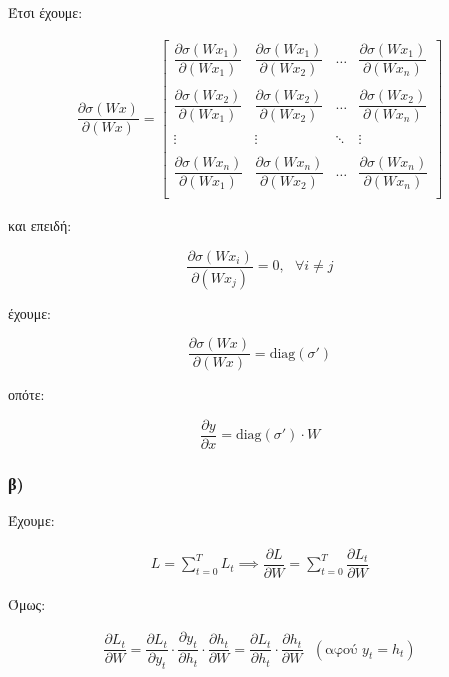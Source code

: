 \documentclass[12pt,a4paper]{article}
\begin{document}
				Έτσι έχουμε:
				
				
				
				\begin{align*}
					\dfrac{\partial \sigma(Wx)}{\partial (Wx)} =
						\begin{bmatrix}
							 \dfrac{\partial \sigma(Wx_1)}{\partial (Wx_1)} & \dfrac{\partial \sigma(Wx_1)}{\partial (Wx_2)} & \ldots & \dfrac{\partial \sigma(Wx_1)}{\partial (Wx_n)} \\
							 & & & \\
							 \dfrac{\partial \sigma(Wx_2)}{\partial (Wx_1)} & \dfrac{\partial \sigma(Wx_2)}{\partial (Wx_2)} & \ldots & \dfrac{\partial \sigma(Wx_2)}{\partial (Wx_n)} \\
							 & & & \\
							 \vdots & \vdots & \ddots & \vdots \\
							 & & & \\
							 \dfrac{\partial \sigma(Wx_n)}{\partial (Wx_1)} & \dfrac{\partial \sigma(Wx_n)}{\partial (Wx_2)} & \ldots & \dfrac{\partial \sigma(Wx_n)}{\partial (Wx_n)} \\
						\end{bmatrix}
				\end{align*}
				
				και επειδή:
				
				\[
					\dfrac{\partial \sigma (Wx_i)}{\partial(Wx_j)} = 0, ~~~\forall i \neq j
				\]
				
				έχουμε:
				
				\[
					\dfrac{\partial \sigma (Wx)}{\partial(Wx)} = \text{diag}(\sigma')
				\]
				
				οπότε:
				
				\[
					\dfrac{\partial y}{\partial x} = \text{diag}(\sigma') \cdot W
				\]
		
			\subsubsection*{β)}
				Έχουμε:
				
				\begin{align*}
					L = \sum_{t=0}^{T} L_t \implies \dfrac{\partial L}{\partial W} = \sum_{t = 0}^{T} \dfrac{\partial L_t}{\partial W}
				\end{align*}
				
				Όμως:
				
				\begin{align*}
					\dfrac{\partial L_t}{\partial W} = \dfrac{\partial L_t}{\partial y_t} \cdot \dfrac{\partial y_t}{\partial h_t} \cdot \dfrac{\partial h_t}{\partial W} =
					\dfrac{\partial L_t}{\partial h_t} \cdot \dfrac{\partial h_t}{\partial W} ~~~(\text{αφού } y_t = h_t)
				\end{align*}
				
\end{document}
